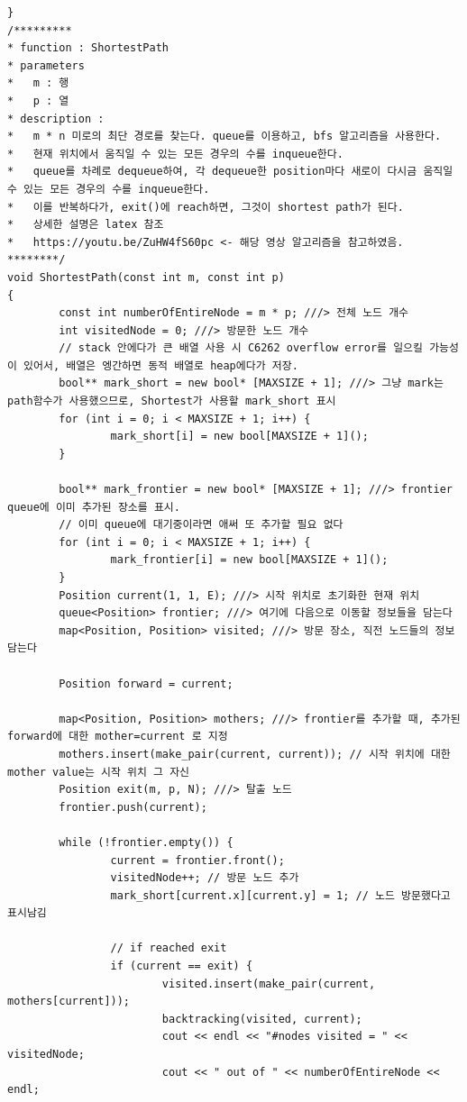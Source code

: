\documentclass{article}
\begin{document}
\begin{verbatim}}
/*********
* function : ShortestPath
* parameters
*	m : 행
*	p : 열
* description :
*	m * n 미로의 최단 경로를 찾는다. queue를 이용하고, bfs 알고리즘을 사용한다.
*	현재 위치에서 움직일 수 있는 모든 경우의 수를 inqueue한다.
*	queue를 차례로 dequeue하여, 각 dequeue한 position마다 새로이 다시금 움직일 수 있는 모든 경우의 수를 inqueue한다.
*	이를 반복하다가, exit()에 reach하면, 그것이 shortest path가 된다.
*	상세한 설명은 latex 참조
*	https://youtu.be/ZuHW4fS60pc <- 해당 영상 알고리즘을 참고하였음.
********/
void ShortestPath(const int m, const int p)
{
    	const int numberOfEntireNode = m * p; ///> 전체 노드 개수
    	int visitedNode = 0; ///> 방문한 노드 개수
    	// stack 안에다가 큰 배열 사용 시 C6262 overflow error를 일으킬 가능성이 있어서, 배열은 엥간하면 동적 배열로 heap에다가 저장.
    	bool** mark_short = new bool* [MAXSIZE + 1]; ///> 그냥 mark는 path함수가 사용했으므로, Shortest가 사용할 mark_short 표시
    	for (int i = 0; i < MAXSIZE + 1; i++) {
        		mark_short[i] = new bool[MAXSIZE + 1]();
    	}
    
    	bool** mark_frontier = new bool* [MAXSIZE + 1]; ///> frontier queue에 이미 추가된 장소를 표시. 
    	// 이미 queue에 대기중이라면 애써 또 추가할 필요 없다
    	for (int i = 0; i < MAXSIZE + 1; i++) {
        		mark_frontier[i] = new bool[MAXSIZE + 1]();
    	}
    	Position current(1, 1, E); ///> 시작 위치로 초기화한 현재 위치
    	queue<Position> frontier; ///> 여기에 다음으로 이동할 정보들을 담는다
    	map<Position, Position> visited; ///> 방문 장소, 직전 노드들의 정보 담는다
    
    	Position forward = current;
    
    	map<Position, Position> mothers; ///> frontier를 추가할 때, 추가된 forward에 대한 mother=current 로 지정
    	mothers.insert(make_pair(current, current)); // 시작 위치에 대한 mother value는 시작 위치 그 자신
    	Position exit(m, p, N); ///> 탈출 노드
    	frontier.push(current);
    
    	while (!frontier.empty()) {
        		current = frontier.front();
        		visitedNode++; // 방문 노드 추가
        		mark_short[current.x][current.y] = 1; // 노드 방문했다고 표시남김
        
        		// if reached exit
        		if (current == exit) {
            			visited.insert(make_pair(current, mothers[current]));
            			backtracking(visited, current);
            			cout << endl << "#nodes visited = " << visitedNode;
            			cout << " out of " << numberOfEntireNode << endl;
            

\end{verbatim}
\end{document}
